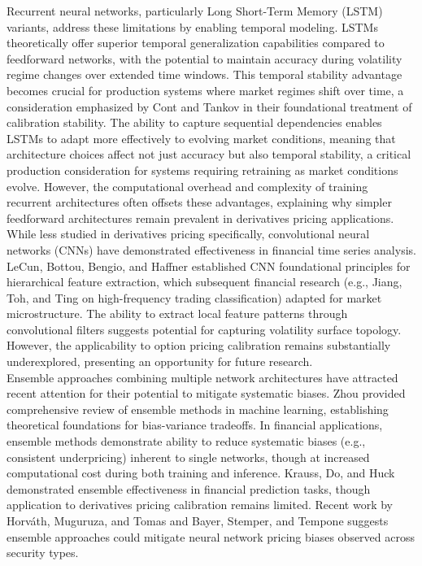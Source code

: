 \documentclass[12pt,a4paper]{article}
\begin{document}
Recurrent neural networks, particularly Long Short-Term Memory (LSTM) variants, address these limitations by enabling temporal modeling. LSTMs theoretically offer superior temporal generalization capabilities compared to feedforward networks, with the potential to maintain accuracy during volatility regime changes over extended time windows. This temporal stability advantage becomes crucial for production systems where market regimes shift over time, a consideration emphasized by Cont and Tankov \cite{Cont2003} in their foundational treatment of calibration stability. The ability to capture sequential dependencies enables LSTMs to adapt more effectively to evolving market conditions, meaning that architecture choices affect not just accuracy but also temporal stability, a critical production consideration for systems requiring retraining as market conditions evolve. However, the computational overhead and complexity of training recurrent architectures often offsets these advantages, explaining why simpler feedforward architectures remain prevalent in derivatives pricing applications.\\[0.05cm]

While less studied in derivatives pricing specifically, convolutional neural networks (CNNs) have demonstrated effectiveness in financial time series analysis. LeCun, Bottou, Bengio, and Haffner \cite{LeCun1998} established CNN foundational principles for hierarchical feature extraction, which subsequent financial research (e.g., Jiang, Toh, and Ting \cite{Jiang2021} on high-frequency trading classification) adapted for market microstructure. The ability to extract local feature patterns through convolutional filters suggests potential for capturing volatility surface topology. However, the applicability to option pricing calibration remains substantially underexplored, presenting an opportunity for future research.\\[0.05cm]

Ensemble approaches combining multiple network architectures have attracted recent attention for their potential to mitigate systematic biases. Zhou \cite{Zhou2012} provided comprehensive review of ensemble methods in machine learning, establishing theoretical foundations for bias-variance tradeoffs. In financial applications, ensemble methods demonstrate ability to reduce systematic biases (e.g., consistent underpricing) inherent to single networks, though at increased computational cost during both training and inference. Krauss, Do, and Huck \cite{Krauss2017} demonstrated ensemble effectiveness in financial prediction tasks, though application to derivatives pricing calibration remains limited. Recent work by Horváth, Muguruza, and Tomas \cite{HorvathMuguruzaTomas2019} and Bayer, Stemper, and Tempone \cite{BayerStemperTempone2019} suggests ensemble approaches could mitigate neural network pricing biases observed across security types.\\[0.05cm]
\end{document}
